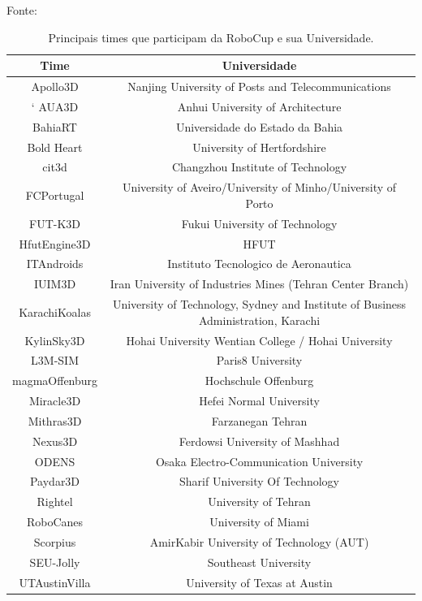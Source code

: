 \begin{table}[h]


\centering

\caption{Principais times que participam da RoboCup e sua Universidade.} Fonte: \cite{SimulationLeague} 

  \begin{tabular}{|c|c|}

    \hline
    \hline
    Time & Universidade \\
    \hline
    \hline
    Apollo3D & Nanjing University of Posts and Telecommunications \\
    \hline`
    AUA3D & Anhui University of Architecture \\
    \hline
    BahiaRT & Universidade do Estado da Bahia \\
    \hline
    Bold Heart & University of Hertfordshire \\
    \hline
    cit3d & Changzhou Institute of Technology \\
    \hline
    FCPortugal & University of Aveiro/University of Minho/University of Porto \\
    \hline
    FUT-K3D & Fukui University of Technology \\
    \hline
    HfutEngine3D & HFUT \\
    \hline
    ITAndroids & Instituto Tecnologico de Aeronautica \\
    \hline
    IUIM3D & Iran University of Industries Mines (Tehran Center Branch) \\
    \hline
    KarachiKoalas & University of Technology, Sydney and Institute of Business Administration, Karachi \\
    \hline
    KylinSky3D & Hohai University Wentian College / Hohai University \\
    \hline
    L3M-SIM & Paris8 University \\
    \hline
    magmaOffenburg & Hochschule Offenburg \\
    \hline
    Miracle3D & Hefei Normal University \\
    \hline
    Mithras3D & Farzanegan Tehran \\
    \hline
    Nexus3D & Ferdowsi University of Mashhad \\
    \hline
    ODENS & Osaka Electro-Communication University \\
    \hline
    Paydar3D & Sharif University Of Technology \\
    \hline
    Rightel & University of Tehran \\
    \hline
    RoboCanes & University of Miami \\
    \hline
    Scorpius & AmirKabir University of Technology (AUT) \\
    \hline
    SEU-Jolly & Southeast University \\
    \hline
    UTAustinVilla & University of Texas at Austin \\
    \hline
    \hline
  \end{tabular}

  \label{tab:times}
\end{table}



